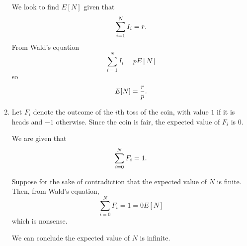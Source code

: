 \documentclass{article}
\begin{document}
\begin{enumerate}
    We look to find $E[N]$ given that
    \[ \sum_{i=1}^N I_i = r \text.\]
    From Wald's equation
    \[ \sum_{i=1}^N I_i = pE[N] \]
    so
    \[ E[N] = \frac{r}{p} \text.\]
\item
    Let $F_i$ denote the outcome of the $i$th toss of the coin, with value $1$ if it is heads and $-1$ otherwise.
    Since the coin is fair, the expected value of $F_i$ is $0$.

    We are given that
    \[ \sum_{i=0}^N F_i = 1 \text. \]

    Suppose for the sake of contradiction that the expected value of $N$ is finite. Then, from Wald's equation,
    \[ \sum_{i=0}^N F_i = 1 = 0E[N] \]
    which is nonsense.

    We can conclude the expected value of $N$ is infinite.
\end{enumerate}
\end{document}
